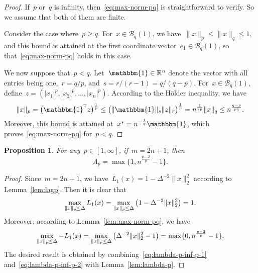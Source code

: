 \documentclass{article}
\numberwithin{equation}{section}
\theoremstyle{definition}
\theoremstyle{plain}
\newtheorem{proposition}{Proposition}[section]
\theoremstyle{remark}
\newcommand*{\abs}[2][]{#1\lvert#2#1\rvert}
\newcommand*{\lagp}[1][]{L\ifblank{#1}{}{_{#1}}}
\newcommand*{\norm}[2][]{#1\lVert#2#1\rVert}
\newcommand*{\R}{\mathbb{R}}
\newcommand*{\set}[2][]{#1\{#2#1\}}
\newcommand*{\T}{\mathsf{T}}
\newcommand{\ones}{\mathbbm{1}}
\begin{document}
\begin{proof}
    If~$p$ or~$q$ is infinity, then~\eqref{eq:max-norm-pq} is straightforward to verify. So we
    assume that both of them are finite.

    Consider the case where~$p \ge q$.
    For~$x \in \mathcal{B}_q(1)$, we have~$\norm{x}_p \le \norm{x}_q \le 1$, and this bound is attained at the
    first coordinate vector~$e_1 \in \mathcal{B}_q(1)$, so that~\eqref{eq:max-norm-pq} holds in this
    case.

    We now suppose that~$p < q$.
    Let~$\ones \in \R^n$ denote the vector with all entries being one,~$r = q/p$, and~$s = r / (r - 1) = q / (q - p)$.
    For~$x \in \mathcal{B}_q(1)$, define~$z = (\abs{x_1}^p, \abs{x_2}^p, \dots, \abs{x_n}^p)$.
    According to the H{\"{o}}lder inequality, we have
    \begin{equation*}
        \norm{x}_p  = \big(\ones^{\T} z \big)^{\frac{1}{p}} \le \big(\norm{\ones}_s \norm{z}_r \big)
        ^{\frac{1}{p}} = n^{\frac{1}{sp}} \norm{x}_q \le n^{\frac{q - p}{pq}}.
    \end{equation*}
    Moreover, this bound is attained at~$x^\ast = n^{-\frac{1}{q}}\ones$, which proves~\eqref{eq:max-norm-pq} for~$p<q$.
\end{proof}

\begin{proposition}
    \label{prop:lambda-p-opt}
    For any~$p \in [1,\infty]$, if~$m = 2n + 1$, then
    \begin{equation*}
        \Lambda_p = \max \set[\big]{1, n^{\frac{p - 2}{p}} - 1}.
    \end{equation*}
\end{proposition}

\begin{proof}
    Since~$m = 2n+1$, we have~$L_1(x) = 1- \Delta^{-2}\norm{x}_2^2$ according to Lemma~\ref{lem:lagp}.
    Then it is clear that
    \begin{equation}
        \label{eq:lambda-p-inf-p-1}
        \max_{\norm{x}_p \le \Delta} \lagp[1](x) = \max_{\norm{x}_p \le \Delta} \big( 1 - \Delta^{-2}{\norm{x}_2^2} \big) = 1.
    \end{equation}
    Moreover, according to Lemma~\ref{lem:max-norm-pq}, we have
    \begin{equation}
        \label{eq:lambda-p-inf-p-2}
        \max_{\norm{x}_p \le \Delta} -\lagp[1](x) = \max_{\norm{x}_p \le \Delta} \big( \Delta^{-2}
        {\norm{x}_2^2} - 1 \big) = \max\{0, n^{\frac{p - 2}{p}} - 1\}.
    \end{equation}
    The desired result is obtained by combining~\eqref{eq:lambda-p-inf-p-1} and~\eqref{eq:lambda-p-inf-p-2} with Lemma~\ref{lem:lambda-p}.
\end{proof}
\end{document}
